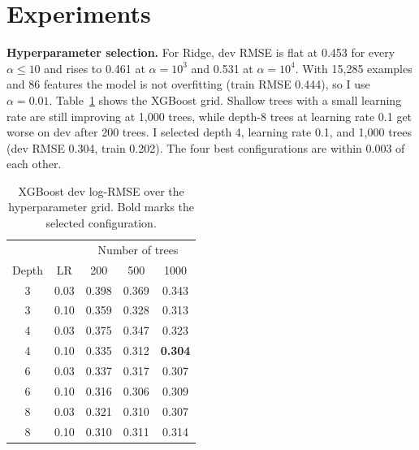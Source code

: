 \documentclass{article}
\begin{document}
\section{Experiments}

\textbf{Hyperparameter selection.} For Ridge, dev RMSE is flat at 0.453 for every $\alpha \le 10$ and rises to 0.461 at $\alpha=10^3$ and 0.531 at $\alpha=10^4$. With 15{,}285 examples and 86 features the model is not overfitting (train RMSE 0.444), so I use $\alpha=0.01$. Table~\ref{tab:xgbgrid} shows the XGBoost grid. Shallow trees with a small learning rate are still improving at 1{,}000 trees, while depth-8 trees at learning rate 0.1 get worse on dev after 200 trees. I selected depth 4, learning rate 0.1, and 1{,}000 trees (dev RMSE 0.304, train 0.202). The four best configurations are within 0.003 of each other.

\begin{table}[t]
\caption{XGBoost dev log-RMSE over the hyperparameter grid. Bold marks the selected configuration.}
\label{tab:xgbgrid}
\vskip 0.05in
\centering
\small
\begin{tabular}{ccccc}
\toprule
& & \multicolumn{3}{c}{Number of trees} \\
Depth & LR & 200 & 500 & 1000 \\
\midrule
3 & 0.03 & 0.398 & 0.369 & 0.343 \\
3 & 0.10 & 0.359 & 0.328 & 0.313 \\
4 & 0.03 & 0.375 & 0.347 & 0.323 \\
4 & 0.10 & 0.335 & 0.312 & \textbf{0.304} \\
6 & 0.03 & 0.337 & 0.317 & 0.307 \\
6 & 0.10 & 0.316 & 0.306 & 0.309 \\
8 & 0.03 & 0.321 & 0.310 & 0.307 \\
8 & 0.10 & 0.310 & 0.311 & 0.314 \\
\bottomrule
\end{tabular}
\end{table}
\end{document}
